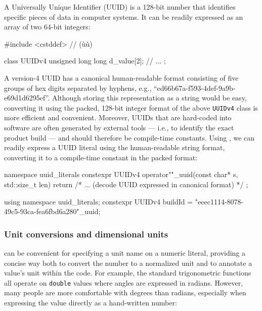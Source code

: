 A Universally Unique Identifier (UUID) is a 128-bit number that
identifies specific pieces of data in computer systems. It can be
readily expressed as an array of two 64-bit integers:

\begin{emcppshiddenlisting}[emcppsbatch=e18]
#include <cstddef>  // (ù{}ù)
\end{emcppshiddenlisting}
\begin{emcppslisting}[emcppsbatch=e18]
class UUIDv4
{
    unsigned long long d_value[2];
    // ...
};
\end{emcppslisting}
    
\noindent A version-4 UUID has a canonical human-readable format consisting of
five groups of hex digits separated by hyphens, e.g.,
``ed66b67a-f593-4def-9a9b-e69d1d6295ef''. Although storing this
representation as a string would be easy, converting it using the
packed, 128-bit integer format of the above \lstinline!UUIDv4! class is
more efficient and convenient. Moreover, UUIDs that are hard-coded into
software are often generated by external tools --- i.e., to identify the
exact product build --- and should therefore be compile-time constants.
Using , we can readily express a UUID literal using the
human-readable string format, converting it to a compile-time constant
in the packed format:

\begin{emcppslisting}[emcppsbatch=e18]
namespace uuid_literals
{
    constexpr UUIDv4 operator""_uuid(const char* s, std::size_t len)
    {
        return { /* ... (decode UUID expressed in canonical format) */ };
    }
}

using namespace uuid_literals;
constexpr UUIDv4 buildId = "eeec1114-8078-49c5-93ca-fea6fbd6a280"_uuid;
\end{emcppslisting}
    

\subsubsection[Unit conversions and dimensional units]{Unit conversions and dimensional units}\label{unit-conversions-and-dimensional-units}

 can be convenient for specifying a unit name on a numeric
literal, providing a concise way both to convert the number to a
normalized unit and to annotate a value's unit within the code. For
example, the standard trigonometric functions all operate on
\lstinline!double! values where angles are expressed in radians. However,
many people are more comfortable with degrees than radians, especially
when expressing the value directly as a hand-written number:

